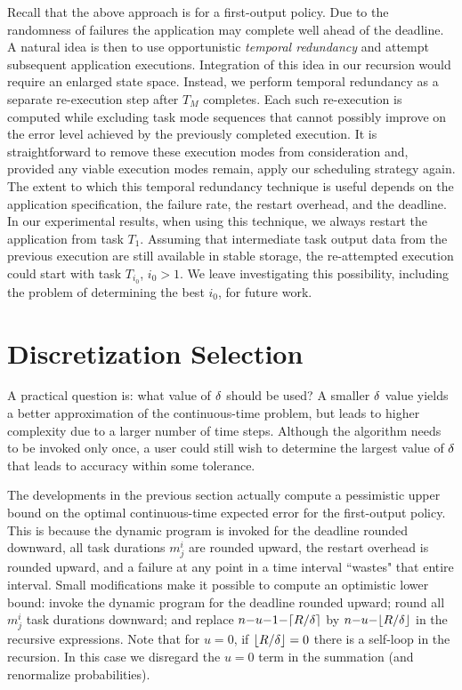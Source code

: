 Recall that the above approach is for a first-output policy. Due to the randomness of
failures the application may complete well ahead of the deadline.  A
natural idea is then to use opportunistic \emph{temporal redundancy} and
attempt subsequent application executions. Integration of this idea in our
recursion would require an enlarged state space.  Instead, we perform
temporal redundancy as a separate re-execution step after $T_M$ completes.
Each such re-execution is computed while excluding task mode sequences
that cannot possibly improve on the error level achieved by the previously
completed execution. It is straightforward to remove these execution modes
from consideration and, provided any viable execution modes remain, apply
our scheduling strategy again. The extent to which this temporal redundancy
technique is useful depends on the application specification, the failure
rate, the restart overhead, and the deadline. In our experimental results,
when using this technique, we always restart the application
from task $T_1$.  Assuming that
intermediate task output data from the previous execution are still
available in stable storage, the re-attempted execution could start
with task $T_{i_0}$, $i_0 > 1$. We leave investigating this possibility, including
the problem of determining the best $i_0$, for future work.


\section{Discretization Selection}

A practical question is: what value of $\delta$ should be used?  A
smaller $\delta$ value yields a better approximation of the continuous-time problem,
but leads to higher complexity due to a larger number of time steps.  
Although the algorithm needs to be invoked only once, a user could still wish
to determine the largest value of $\delta$ that leads to accuracy within
some tolerance.

The developments in the previous section actually compute a pessimistic
upper bound on the optimal continuous-time expected error for the first-output
policy.  This is because the dynamic program is invoked for the deadline
rounded downward, all task durations $m^i_j$ are rounded upward, the
restart overhead is rounded upward, and a failure at any point in a time
interval ``wastes" that entire interval.  Small modifications make it
possible to compute an optimistic lower bound: invoke the
dynamic program for the deadline rounded upward; round all $m^i_j$ task
durations downward; and replace $n{-}u{-}1{-}\lceil R/\delta\rceil$ by
$n{-}u{-}\lfloor R/\delta \rfloor$ in the recursive expressions.  Note
that for $u=0$, if $\lfloor R / \delta \rfloor = 0$ there is a self-loop in
the recursion. In this case we disregard the $u=0$ term in the summation
(and renormalize probabilities).


